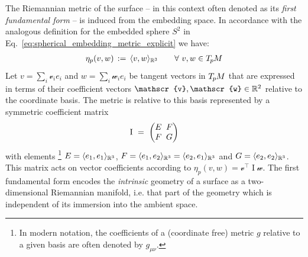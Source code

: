 The Riemannian metric of the surface -- in this context often denoted as its \emph{first fundamental form} -- is induced from the embedding space.
In accordance with the analogous definition for the embedded sphere $S^2$ in Eq.~\eqref{eq:spherical_embedding_metric_explicit} we have:
\begin{align}\label{eq:surface_embedding_metric}
    \eta_p(v,w) \,:=\, \langle v,w \rangle_{\mathbb{R}^3} \qquad \forall\ v,w \in T_{\mkern-1.5mu p}\mkern-.5muM
\end{align}
Let $v = \sum_i \mathscr{v}_i e_i$ and $w = \sum_i \mathscr{w}_i e_i$ be tangent vectors in $T_{\mkern-1.5mu p}\mkern-.5muM$ that are expressed in terms of their coefficient vectors $\mathscr{v},\mathscr{w}\in\R^2$ relative to the coordinate basis.
The metric is relative to this basis represented by a symmetric coefficient matrix
\begin{align}
    \operatorname{I}
    \ =\ 
    \begin{pmatrix}
           E \mkern-8mu& F \\
           F \mkern-8mu& G
    \end{pmatrix}
\end{align}
with elements%
\footnote{
    In modern notation, the coefficients of a (coordinate free) metric $g$ relative to a given basis are often denoted by $g_{\mu\nu}$.
}
$E = \langle e_1, e_1 \rangle_{\mathbb{R}^3}$,
$F = \langle e_1, e_2 \rangle_{\mathbb{R}^3}
   = \langle e_2, e_1 \rangle_{\mathbb{R}^3}$ and
$G = \langle e_2, e_2 \rangle_{\mathbb{R}^3}$.
This matrix acts on vector coefficients according to $\eta_p(v,w) = \mathscr{v}^\top \operatorname{I}\mathscr{w}$.
The first fundamental form encodes the \emph{intrinsic} geometry of a surface as a two-dimensional Riemannian manifold, i.e. that part of the geometry which is independent of its immersion into the ambient space.


